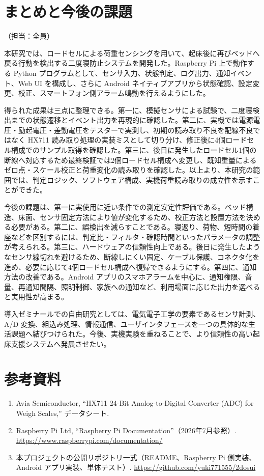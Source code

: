 \documentclass[paper=a4,fontsize=10pt,ja=standard,lualatex]{jlreq}
\newcommand{\AuthorNote}[1]{\hfill{\small （担当：#1）}}
\begin{document}
\section{まとめと今後の課題}
\label{sec:conclusion}
\AuthorNote{全員}

本研究では、ロードセルによる荷重センシングを用いて、起床後に再びベッドへ戻る行動を検出する二度寝防止システムを開発した。Raspberry Pi 上で動作する Python プログラムとして、センサ入力、状態判定、ログ出力、通知イベント、Web UI を構成し、さらに Android ネイティブアプリから状態確認、設定変更、校正、スマートフォン側アラーム鳴動を行えるようにした。

得られた成果は三点に整理できる。第一に、模擬センサによる試験で、二度寝検出までの状態遷移とイベント出力を再現的に確認した。第二に、実機では電源電圧・励起電圧・差動電圧をテスターで実測し、初期の読み取り不良を配線不良ではなく HX711 読み取り処理の実装ミスとして切り分け、修正後に4個ロードセル構成でのサンプル取得を確認した。第三に、後日に発生したロードセル1個の断線へ対応するため最終検証では2個ロードセル構成へ変更し、既知重量によるゼロ点・スケール校正と荷重変化の読み取りを確認した。以上より、本研究の範囲では、判定ロジック、ソフトウェア構成、実機荷重読み取りの成立性を示すことができた。

今後の課題は、第一に実使用に近い条件での測定安定性評価である。ベッド構造、床面、センサ固定方法により値が変化するため、校正方法と設置方法を決める必要がある。第二に、誤検出を減らすことである。寝返り、荷物、短時間の着座などを区別するには、判定比・フィルタ・確認時間といったパラメータの調整が考えられる。第三に、ハードウェアの信頼性向上である。後日に発生したようなセンサ線切れを避けるため、断線しにくい固定、ケーブル保護、コネクタ化を進め、必要に応じて4個ロードセル構成へ復帰できるようにする。第四に、通知方法の改善である。Android アプリのスマホアラームを中心に、通知権限、音量、再通知間隔、照明制御、家族への通知など、利用場面に応じた出力を選べると実用性が高まる。

導入ゼミナールでの自由研究としては、電気電子工学の要素であるセンサ計測、A/D 変換、組込み処理、情報通信、ユーザインタフェースを一つの具体的な生活課題へ結びつけられた。今後、実機実験を重ねることで、より信頼性の高い起床支援システムへ発展させたい。

\section*{参考資料}
\begin{enumerate}
  \item Avia Semiconductor, ``HX711 24-Bit Analog-to-Digital Converter (ADC) for Weigh Scales,'' データシート.
  \item Raspberry Pi Ltd, ``Raspberry Pi Documentation''（2026年7月参照）. \url{https://www.raspberrypi.com/documentation/}
  \item 本プロジェクトの公開リポジトリ一式（README、Raspberry Pi 側実装、Android アプリ実装、単体テスト）. \url{https://github.com/yuki771555/2dosui}
\end{enumerate}
\end{document}
